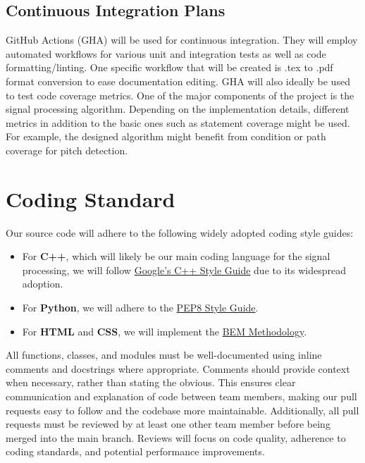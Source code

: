 \documentclass{article}
\begin{document}
\subsection{Continuous Integration Plans}
GitHub Actions (GHA) will be used for continuous integration. They will employ automated workflows for various unit and integration tests
as well as code formatting/linting. One specific workflow that will be created is .tex to .pdf format conversion to ease documentation editing.
GHA will also ideally be used to test code coverage metrics. One of the major components of the project is the signal processing algorithm.  
Depending on the implementation details, different metrics in addition to the basic ones such as statement coverage might be used. For example, the designed algorithm 
might benefit from condition or path coverage for pitch detection.

\section{Coding Standard}

Our source code will adhere to the following widely adopted coding style guides:

\begin{itemize}
    \item For \textbf{C++}, which will likely be our main coding language for the signal processing, we will follow \href{https://google.github.io/styleguide/cppguide.html}{Google's C++ Style Guide} due to its widespread adoption.
    \item For \textbf{Python}, we will adhere to the \href{https://peps.python.org/pep-0008/}{PEP8 Style Guide}.
    \item For \textbf{HTML} and \textbf{CSS}, we will implement the \href{https://getbem.com/}{BEM Methodology}.
\end{itemize}

All functions, classes, and modules must be well-documented using inline comments and docstrings where appropriate. Comments should provide context when necessary, rather than stating the obvious. This ensures clear communication and explanation of code between team members, making our pull requests easy to follow and the codebase more maintainable.
Additionally, all pull requests must be reviewed by at least one other team member before being merged into the main branch. Reviews will focus on code quality, adherence to coding standards, and potential performance improvements.
\end{document}
